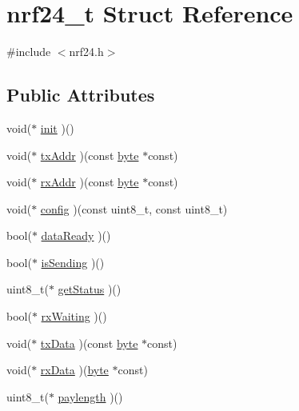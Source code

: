 \hypertarget{structnrf24__t}{}\section{nrf24\+\_\+t Struct Reference}
\label{structnrf24__t}


{\ttfamily \#include $<$nrf24.\+h$>$}

\subsection*{Public Attributes}
\begin{DoxyCompactItemize}
\item 
void($\ast$ \hyperlink{structnrf24__t_a1b0228efa4dec38bb902bf988e905fd4}{init} )()
\item 
void($\ast$ \hyperlink{structnrf24__t_abfc805d8cb41f8a3bf611a76a5d830db}{tx\+Addr} )(const \hyperlink{examples_2Nrf24_2Tx_2src_2cavrn_8h_ab8ef12fab634c171394422d0ee8baf94}{byte} $\ast$const)
\item 
void($\ast$ \hyperlink{structnrf24__t_acf773cd1e2f2c5c0ce507320f9b7a45f}{rx\+Addr} )(const \hyperlink{examples_2Nrf24_2Tx_2src_2cavrn_8h_ab8ef12fab634c171394422d0ee8baf94}{byte} $\ast$const)
\item 
void($\ast$ \hyperlink{structnrf24__t_a84a2a68d2e139d5d1f12b26f1883f401}{config} )(const uint8\+\_\+t, const uint8\+\_\+t)
\item 
bool($\ast$ \hyperlink{structnrf24__t_ae3ba9b440dc852e8ef9ddc43304f3228}{data\+Ready} )()
\item 
bool($\ast$ \hyperlink{structnrf24__t_a187270f5a397a1425c860f06f1c946ba}{is\+Sending} )()
\item 
uint8\+\_\+t($\ast$ \hyperlink{structnrf24__t_ad0896af4e3e40a15bd991aec48769cd4}{get\+Status} )()
\item 
bool($\ast$ \hyperlink{structnrf24__t_a55d42334a0c98fdf58b7125c843d1370}{rx\+Waiting} )()
\item 
void($\ast$ \hyperlink{structnrf24__t_a1dbfdf83bc96820d8a24cb7a34f58ef8}{tx\+Data} )(const \hyperlink{examples_2Nrf24_2Tx_2src_2cavrn_8h_ab8ef12fab634c171394422d0ee8baf94}{byte} $\ast$const)
\item 
void($\ast$ \hyperlink{structnrf24__t_a8d5ef96e697b56dcf24469366ebf2e58}{rx\+Data} )(\hyperlink{examples_2Nrf24_2Tx_2src_2cavrn_8h_ab8ef12fab634c171394422d0ee8baf94}{byte} $\ast$const)
\item 
uint8\+\_\+t($\ast$ \hyperlink{structnrf24__t_ad8cd539e47d8d842d9877d1ae8d55097}{paylength} )()

\end{DoxyCompactItemize}

